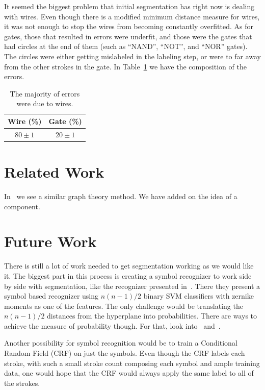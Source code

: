 \documentclass[10pt]{acmsiggraph}               %
\begin{document}
It seemed the biggest problem that initial segmentation has right now is dealing with wires.  
Even though there is a modified minimum distance measure for wires, it was not enough to stop the wires from becoming constantly overfitted.
As for gates, those that resulted in errors were underfit, and those were the gates that had circles at the end of them (such as ``NAND'', ``NOT'', and ``NOR'' gates).
The circles were either getting mislabeled in the labeling step, or were to far away from the other strokes in the gate.
In Table~\ref{table:results2} we have the composition of the errors.

\begin{table}[h]
\begin{tabular}{|cc|}
\hline
Wire (\%)& Gate (\%)\\
\hline
$80 \pm 1$ & $20 \pm 1$\\
\hline
\end{tabular}
\caption{The majority of errors were due to wires.}  
\label{table:results2}
\end{table}


\section{Related Work}

In~\cite{spatial} we see a similar graph theory method.
We have added on the idea of a component.

\section{Future Work}
There is still a lot of work needed to get segmentation working as we would like it.
The biggest part in this process is creating a symbol recognizer to work side by side with segmentation, like the recognizer presented in~\cite{zernike}.
There they present a symbol based recognizer using $n(n - 1)/2$ binary SVM classifiers with zernike moments as one of the features.
The only challenge would be translating the $n(n - 1)/2$ distances from the hyperplane into probabilities.
There are ways to achieve the measure of probability though.
For that, look into~\cite{ping-simple} and~\cite{roth01probabilistic}.

Another possibility for symbol recognition would be to train a Conditional Random Field (CRF) on just the symbols.
Even though the CRF labels each stroke, with such a small stroke count composing each symbol and ample training data, one would hope that the CRF would always apply the same label to all of the strokes.
\end{document}
